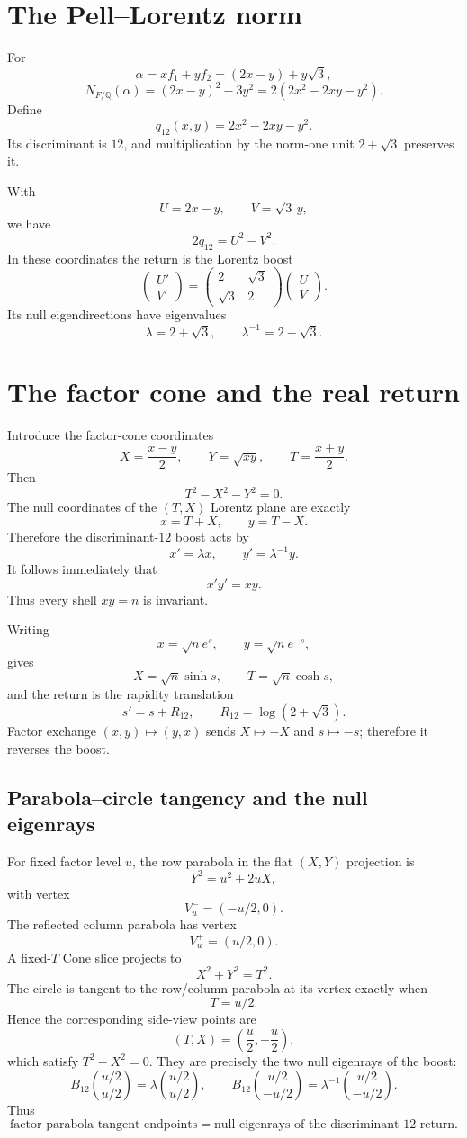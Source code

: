 \documentclass[11pt]{article}
\theoremstyle{definition}
\theoremstyle{remark}
\newcommand{\Q}{\mathbb Q}
\begin{document}
\section{The Pell--Lorentz norm}

For
\[
\alpha=xf_1+yf_2=(2x-y)+y\sqrt3,
\]
\[
N_{F/\Q}(\alpha)
=(2x-y)^2-3y^2
=2(2x^2-2xy-y^2).
\]
Define
\[
q_{12}(x,y)=2x^2-2xy-y^2.
\]
Its discriminant is $12$, and multiplication by the norm-one unit
$2+\sqrt3$ preserves it.

With
\[
U=2x-y,
\qquad
V=\sqrt3\,y,
\]
we have
\[
\boxed{2q_{12}=U^2-V^2.}
\]
In these coordinates the return is the Lorentz boost
\[
\boxed{
\begin{pmatrix}U'\\V'\end{pmatrix}
=
\begin{pmatrix}2&\sqrt3\\\sqrt3&2\end{pmatrix}
\begin{pmatrix}U\\V\end{pmatrix}.
}
\]
Its null eigendirections have eigenvalues
\[
\lambda=2+\sqrt3,
\qquad
\lambda^{-1}=2-\sqrt3.
\]

\section{The factor cone and the real return}

Introduce the factor-cone coordinates
\[
X=\frac{x-y}{2},
\qquad
Y=\sqrt{xy},
\qquad
T=\frac{x+y}{2}.
\]
Then
\[
T^2-X^2-Y^2=0.
\]
The null coordinates of the $(T,X)$ Lorentz plane are exactly
\[
x=T+X,
\qquad
y=T-X.
\]
Therefore the discriminant-$12$ boost acts by
\[
\boxed{x'=\lambda x,\qquad y'=\lambda^{-1}y.}
\]
It follows immediately that
\[
x'y'=xy.
\]
Thus every shell $xy=n$ is invariant.

Writing
\[
x=\sqrt n e^s,
\qquad
y=\sqrt n e^{-s},
\]
gives
\[
X=\sqrt n\sinh s,
\qquad
T=\sqrt n\cosh s,
\]
and the return is the rapidity translation
\[
\boxed{s'=s+R_{12},\qquad R_{12}=\log(2+\sqrt3).}
\]
Factor exchange $(x,y)\mapsto(y,x)$ sends $X\mapsto-X$ and $s\mapsto-s$;
therefore it reverses the boost.

\subsection{Parabola--circle tangency and the null eigenrays}

For fixed factor level $u$, the row parabola in the flat $(X,Y)$ projection is
\[
Y^2=u^2+2uX,
\]
with vertex
\[
V_u^-=(-u/2,0).
\]
The reflected column parabola has vertex
\[
V_u^+=(u/2,0).
\]
A fixed-$T$ Cone slice projects to
\[
X^2+Y^2=T^2.
\]
The circle is tangent to the row/column parabola at its vertex exactly when
\[
\boxed{T=u/2.}
\]
Hence the corresponding side-view points are
\[
(T,X)=\left(\frac u2,\pm\frac u2\right),
\]
which satisfy $T^2-X^2=0$.  They are precisely the two null eigenrays of the
boost:
\[
B_{12}\binom{u/2}{u/2}
=\lambda\binom{u/2}{u/2},
\qquad
B_{12}\binom{u/2}{-u/2}
=\lambda^{-1}\binom{u/2}{-u/2}.
\]
Thus
\[
\boxed{
\text{factor-parabola tangent endpoints}
=
\text{null eigenrays of the discriminant-$12$ return}.}
\]
\end{document}
